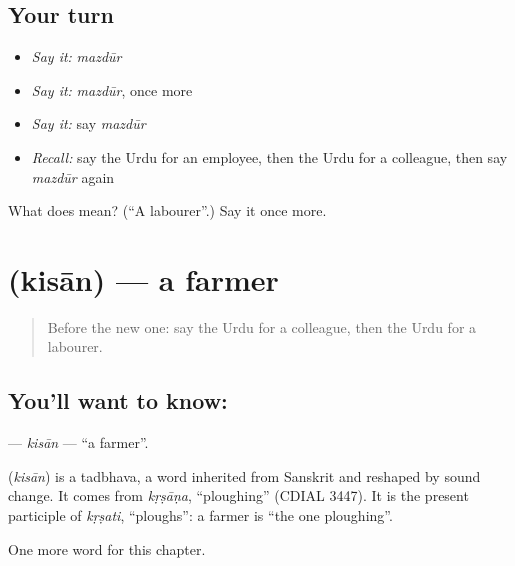 \subsection*{Your turn}
\begin{itemize}
\raggedright
  \item \emph{Say it:} \emph{mazdūr}
  \item \emph{Say it:} \emph{mazdūr}, once more
  \item \emph{Say it:} say \emph{mazdūr}
  \item \emph{Recall:} say the Urdu for an employee, then the Urdu for a colleague, then say \emph{mazdūr} again
\end{itemize}

\begin{tcolorbox}[breakable,colback=teal!4,colframe=teal!35!black,title={Before you move on}]
What does  mean? (\textquotedblleft{}A labourer\textquotedblright{}.) Say it once more.
\end{tcolorbox}
\section[\texorpdfstring{\ur{کسان} (kisān)}{کسان (kisān)}]{ (kisān) — a farmer}

\label{lesson:UR-C177-kisan}



\begin{quote}
Before the new one: say the Urdu for a colleague, then the Urdu for a labourer.
\end{quote}

\subsection*{You'll want to know: }
\textbf{} — \emph{kisān} — \textquotedblleft{}a farmer\textquotedblright{}.

\begin{cousinweb}
\textbf{} (\emph{kisān}) is a tadbhava, a word inherited from Sanskrit and reshaped by sound change. It comes from \emph{kṛṣāṇa}, \textquotedblleft{}ploughing\textquotedblright{} (CDIAL 3447). It is the present participle of \emph{kṛṣati}, \textquotedblleft{}ploughs\textquotedblright{}: a farmer is \textquotedblleft{}the one ploughing\textquotedblright{}.
\end{cousinweb}

\begin{grammarlens}[title={What you've built}]
One more word for this chapter.
\end{grammarlens}

